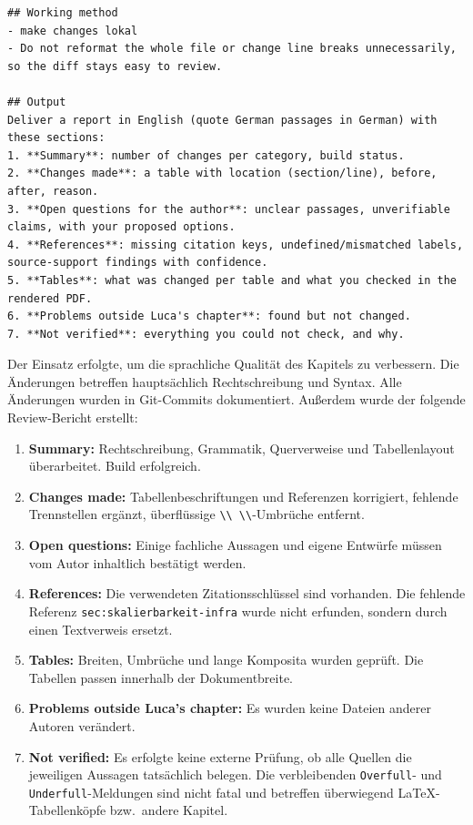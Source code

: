 \begin{lstlisting}
## Working method
- make changes lokal
- Do not reformat the whole file or change line breaks unnecessarily, so the diff stays easy to review.
 
## Output
Deliver a report in English (quote German passages in German) with these sections:
1. **Summary**: number of changes per category, build status.
2. **Changes made**: a table with location (section/line), before, after, reason.
3. **Open questions for the author**: unclear passages, unverifiable claims, with your proposed options.
4. **References**: missing citation keys, undefined/mismatched labels, source-support findings with confidence.
5. **Tables**: what was changed per table and what you checked in the rendered PDF.
6. **Problems outside Luca's chapter**: found but not changed.
7. **Not verified**: everything you could not check, and why.
\end{lstlisting}
 
\noindent Der Einsatz erfolgte, um die sprachliche Qualität des Kapitels zu verbessern. Die Änderungen betreffen hauptsächlich Rechtschreibung und Syntax. Alle Änderungen wurden in Git-Commits dokumentiert. Außerdem wurde der folgende Review-Bericht erstellt:
\begin{enumerate}
    \item \textbf{Summary:} Rechtschreibung, Grammatik, Querverweise und Tabellenlayout überarbeitet. Build erfolgreich.
    \item \textbf{Changes made:} Tabellenbeschriftungen und Referenzen korrigiert, fehlende Trennstellen ergänzt, überflüssige \texttt{\textbackslash\textbackslash\ \textbackslash\textbackslash}-Umbrüche entfernt.
    \item \textbf{Open questions:} Einige fachliche Aussagen und eigene Entwürfe müssen vom Autor inhaltlich bestätigt werden.
    \item \textbf{References:} Die verwendeten Zitationsschlüssel sind vorhanden. Die fehlende Referenz \texttt{sec:skalierbarkeit-infra} wurde nicht erfunden, sondern durch einen Textverweis ersetzt.
    \item \textbf{Tables:} Breiten, Umbrüche und lange Komposita wurden geprüft. Die Tabellen passen innerhalb der Dokumentbreite.
    \item \textbf{Problems outside Luca's chapter:} Es wurden keine Dateien anderer Autoren verändert.
    \item \textbf{Not verified:} Es erfolgte keine externe Prüfung, ob alle Quellen die jeweiligen Aussagen tatsächlich belegen. Die verbleibenden \texttt{Overfull}- und \texttt{Underfull}-Meldungen sind nicht fatal und betreffen überwiegend LaTeX-Tabellenköpfe bzw.\ andere Kapitel.
\end{enumerate}